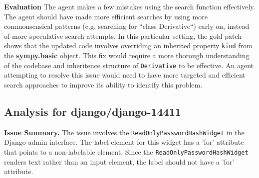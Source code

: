 \textbf{Evaluation}
The agent makes a few mistakes using the search function effectively.
The agent should have made more efficient searches by using more commonsensical patterns (e.g. searching for ``class Derivative``) early on, instead of more speculative search attempts.
In this particular setting, the gold patch shows that the updated code involves overriding an inherited property \texttt{kind} from the \textbf{sympy.basic} object.
This fix would require a more thorough understanding of the codebase and inheritence structure of \texttt{Derivative} to be effective.
An agent attempting to resolve this issue would need to have more targeted and efficient search approaches to improve its ability to identify this problem.



\subsection*{Analysis for django/django-14411}

\textbf{Issue Summary.}
The issue involves the \texttt{ReadOnlyPasswordHashWidget} in the Django admin interface.
The label element for this widget has a 'for' attribute that points to a non-labelable element.
Since the \texttt{ReadOnlyPasswordHashWidget} renders text rather than an input element, the label should not have a 'for' attribute.

